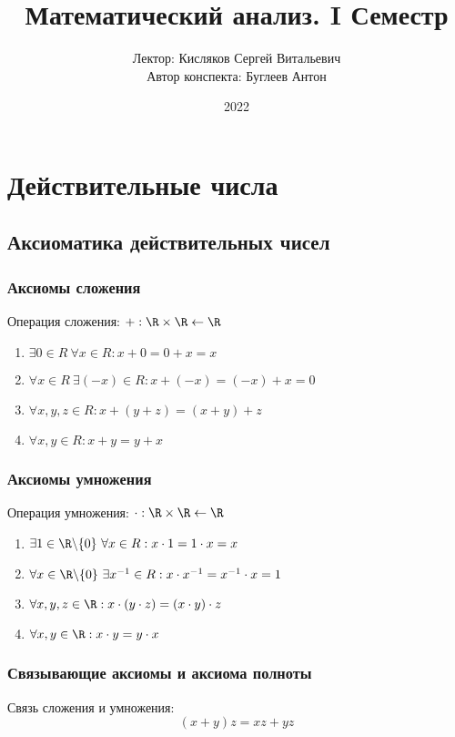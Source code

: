 \documentclass[a4paper, 14pt]{article}
\title{Математический анализ. I Семестр}
\author{Лектор: Кисляков Сергей Витальевич \\
        Автор конспекта: Буглеев Антон}
\date{2022}
\begin{document}
    \maketitle
    
    \section{Действительные числа}
    \subsection{Аксиоматика действительных чисел}
    \subsubsection*{Аксиомы сложения}

    Операция сложения: $+: \R \times \R \leftarrow \R$

    \begin{enumerate}
        \item $\exists 0 \in R \ \forall x \in R: x + 0 = 0 + x = x$
        \item $\forall x \in R \ \exists (-x) \in R: x + (-x) = (-x) + x = 0$
        \item $\forall x, y, z \in R: x + (y + z) = (x + y) + z$
        \item $\forall x, y \in R: x + y = y + x$
    \end{enumerate}

    \subsubsection*{Аксиомы умножения}
    Операция умножения: $\cdot: \R \times \R \leftarrow \R$

    \begin{enumerate}
        \item $\exists 1 \in \R \backslash \{0\} \ \forall x \in R: x\cdot 1 = 1\cdot x = x$
        \item $\forall x \in \R \backslash \{0\} \ \exists x^{-1} \in R: x \cdot x^{-1} = x^{-1} \cdot x = 1$
        \item $\forall x,y,z \in \R: x \cdot (y \cdot z) = (x \cdot y) \cdot z$
        \item $\forall x,y \in \R: x \cdot y = y \cdot x$
    \end{enumerate}


    \subsubsection*{Связывающие аксиомы и аксиома полноты}
    Связь сложения и умножения: \[(x+y)z = xz + yz\]
\end{document}
